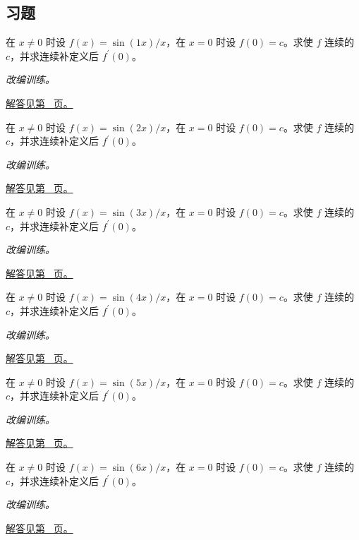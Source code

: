 \documentclass[12pt,fontset=fandol]{ctexart}
\begin{document}
\subsection{习题}
\begin{example}[可去间断点的补定义]\label{ex:c6q1}
在 $x\ne0$ 时设 $f(x)=\sin(1x)/x$，在 $x=0$ 时设 $f(0)=c$。求使 $f$ 连续的 $c$，并求连续补定义后 $f^{\prime}(0)$。
\par\textit{改编训练。}\par\hyperref[ans:c6q1]{解答见第~\pageref{ans:c6q1} 页。}
\end{example}
\begin{example}[可去间断点的补定义]\label{ex:c6q2}
在 $x\ne0$ 时设 $f(x)=\sin(2x)/x$，在 $x=0$ 时设 $f(0)=c$。求使 $f$ 连续的 $c$，并求连续补定义后 $f^{\prime}(0)$。
\par\textit{改编训练。}\par\hyperref[ans:c6q2]{解答见第~\pageref{ans:c6q2} 页。}
\end{example}
\begin{example}[可去间断点的补定义]\label{ex:c6q3}
在 $x\ne0$ 时设 $f(x)=\sin(3x)/x$，在 $x=0$ 时设 $f(0)=c$。求使 $f$ 连续的 $c$，并求连续补定义后 $f^{\prime}(0)$。
\par\textit{改编训练。}\par\hyperref[ans:c6q3]{解答见第~\pageref{ans:c6q3} 页。}
\end{example}
\begin{example}[可去间断点的补定义]\label{ex:c6q4}
在 $x\ne0$ 时设 $f(x)=\sin(4x)/x$，在 $x=0$ 时设 $f(0)=c$。求使 $f$ 连续的 $c$，并求连续补定义后 $f^{\prime}(0)$。
\par\textit{改编训练。}\par\hyperref[ans:c6q4]{解答见第~\pageref{ans:c6q4} 页。}
\end{example}
\begin{example}[可去间断点的补定义]\label{ex:c6q5}
在 $x\ne0$ 时设 $f(x)=\sin(5x)/x$，在 $x=0$ 时设 $f(0)=c$。求使 $f$ 连续的 $c$，并求连续补定义后 $f^{\prime}(0)$。
\par\textit{改编训练。}\par\hyperref[ans:c6q5]{解答见第~\pageref{ans:c6q5} 页。}
\end{example}
\begin{example}[可去间断点的补定义]\label{ex:c6q6}
在 $x\ne0$ 时设 $f(x)=\sin(6x)/x$，在 $x=0$ 时设 $f(0)=c$。求使 $f$ 连续的 $c$，并求连续补定义后 $f^{\prime}(0)$。
\par\textit{改编训练。}\par\hyperref[ans:c6q6]{解答见第~\pageref{ans:c6q6} 页。}
\end{example}
\end{document}
